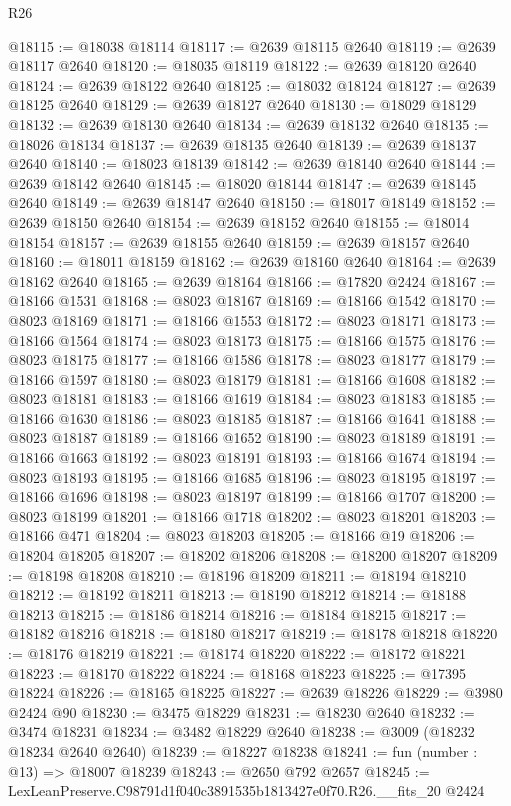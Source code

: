 \begin{lexlean}{R26}
\begin{coremodule}
@18115 := @18038 @18114
@18117 := @2639 @18115 @2640
@18119 := @2639 @18117 @2640
@18120 := @18035 @18119
@18122 := @2639 @18120 @2640
@18124 := @2639 @18122 @2640
@18125 := @18032 @18124
@18127 := @2639 @18125 @2640
@18129 := @2639 @18127 @2640
@18130 := @18029 @18129
@18132 := @2639 @18130 @2640
@18134 := @2639 @18132 @2640
@18135 := @18026 @18134
@18137 := @2639 @18135 @2640
@18139 := @2639 @18137 @2640
@18140 := @18023 @18139
@18142 := @2639 @18140 @2640
@18144 := @2639 @18142 @2640
@18145 := @18020 @18144
@18147 := @2639 @18145 @2640
@18149 := @2639 @18147 @2640
@18150 := @18017 @18149
@18152 := @2639 @18150 @2640
@18154 := @2639 @18152 @2640
@18155 := @18014 @18154
@18157 := @2639 @18155 @2640
@18159 := @2639 @18157 @2640
@18160 := @18011 @18159
@18162 := @2639 @18160 @2640
@18164 := @2639 @18162 @2640
@18165 := @2639 @18164
@18166 := @17820 @2424
@18167 := @18166 @1531
@18168 := @8023 @18167
@18169 := @18166 @1542
@18170 := @8023 @18169
@18171 := @18166 @1553
@18172 := @8023 @18171
@18173 := @18166 @1564
@18174 := @8023 @18173
@18175 := @18166 @1575
@18176 := @8023 @18175
@18177 := @18166 @1586
@18178 := @8023 @18177
@18179 := @18166 @1597
@18180 := @8023 @18179
@18181 := @18166 @1608
@18182 := @8023 @18181
@18183 := @18166 @1619
@18184 := @8023 @18183
@18185 := @18166 @1630
@18186 := @8023 @18185
@18187 := @18166 @1641
@18188 := @8023 @18187
@18189 := @18166 @1652
@18190 := @8023 @18189
@18191 := @18166 @1663
@18192 := @8023 @18191
@18193 := @18166 @1674
@18194 := @8023 @18193
@18195 := @18166 @1685
@18196 := @8023 @18195
@18197 := @18166 @1696
@18198 := @8023 @18197
@18199 := @18166 @1707
@18200 := @8023 @18199
@18201 := @18166 @1718
@18202 := @8023 @18201
@18203 := @18166 @471
@18204 := @8023 @18203
@18205 := @18166 @19
@18206 := @18204 @18205
@18207 := @18202 @18206
@18208 := @18200 @18207
@18209 := @18198 @18208
@18210 := @18196 @18209
@18211 := @18194 @18210
@18212 := @18192 @18211
@18213 := @18190 @18212
@18214 := @18188 @18213
@18215 := @18186 @18214
@18216 := @18184 @18215
@18217 := @18182 @18216
@18218 := @18180 @18217
@18219 := @18178 @18218
@18220 := @18176 @18219
@18221 := @18174 @18220
@18222 := @18172 @18221
@18223 := @18170 @18222
@18224 := @18168 @18223
@18225 := @17395 @18224
@18226 := @18165 @18225
@18227 := @2639 @18226
@18229 := @3980 @2424 @90
@18230 := @3475 @18229
@18231 := @18230 @2640
@18232 := @3474 @18231
@18234 := @3482 @18229 @2640
@18238 := @3009 (@18232 @18234 @2640 @2640)
@18239 := @18227 @18238
@18241 := fun (number : @13) => @18007 @18239
@18243 := @2650 @792 @2657
@18245 := LexLeanPreserve.C98791d1f040c3891535b1813427e0f70.R26.__fits_20 @2424

\end{coremodule}
\end{lexlean}
